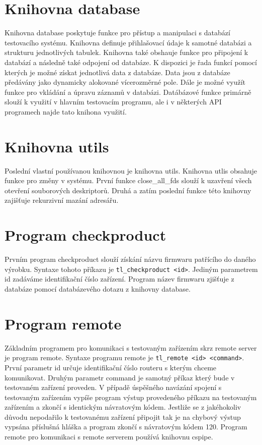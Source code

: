 \section{Knihovna database}
Knihovna database poskytuje funkce pro přístup a manipulaci s databází testovacího systému. Knihovna definuje přihlašovací údaje k samotné databázi a strukturu jednotlivých tabulek. Knihovna také obshauje funkce pro připojení k databází a následně také odpojení od databáze. K dispozici je řada funkcí pomocí kterých je možné získat jednotlivá data z databáze. Data jsou z databáze předávány jako dynamicky alokované vícerozměrné pole. Dále je možné využít funkce pro vkládání a úpravu záznamů v databázi. Datábázové funkce primárně slouží k využití v hlavním testovacím programu, ale i v některých API programech najde tato knihona využití.

\section{Knihovna utils}
Poslední vlastní používanou knihovnou je knihovna utils. Knihovna utlis obsahuje funkce pro změny v systému. První funkce close\_all\_fds slouží k uzavření všech otevření souborových deskriptorů. Druhá a zatím poslední funkce této knihovny zajišťuje rekurzivní mazání adresářu.

\section{Program checkproduct}
Prvním program checkproduct slouží získání názvu firmwaru patřícího do daného výrobku. Syntaxe tohoto příkazu je \texttt{tl\_checkproduct <id>}. Jediným parametrem id zadáváme identifikační číslo zařízení. Program název firmwaru zjišťuje z databáze pomocí databázevého dotazu z knihovny database.

\section{Program remote}
Základním programem pro komunikaci s testovaným zařízením skrz remote server je program remote. Syntaxe programu remote je \texttt{tl\_remote <id> <command>}. První parametr id určuje identifikační číslo routeru s kterým chceme komunikovat. Druhým parametr command je samotný příkaz který bude v testovaném zařízení proveden. V případě úspěšného navázání spojení s testovaným zařízením vypíše program výstup provedeného příkazu na testovaným zařízením a zkončí s identickým návratovým kódem. Jestliže se z jakéhokoliv důvodu nepodařilo k testovanému zařízení připojit tak je na chybový výstup vypsána příslušná hláška a program zkončí s návratovým kódem 120. Program remote pro komunikaci s remote serverem používá knihovnu cspipe.

